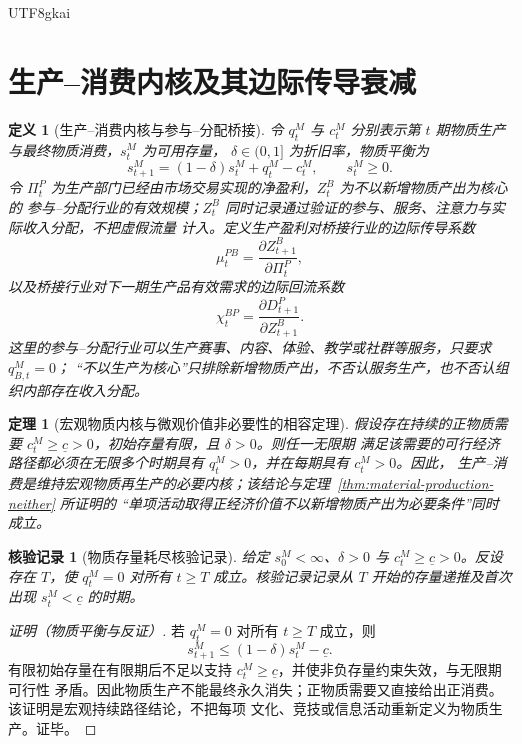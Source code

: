 \documentclass[12pt,a4paper,openany]{report}
\newtheorem{definition}{定义}[chapter]
\newtheorem{theorem}{定理}[chapter]
\newtheorem{Certificate}{核验记录}[chapter]
\begin{document}
\begin{CJK*}{UTF8}{gkai}
\section{生产--消费内核及其边际传导衰减}

\begin{definition}[生产--消费内核与参与--分配桥接]
令 \(q_t^M\) 与 \(c_t^M\) 分别表示第 \(t\) 期物质生产与最终物质消费，\(s_t^M\) 为可用存量，
\(\delta\in(0,1]\) 为折旧率，物质平衡为
\[
  s_{t+1}^M=(1-\delta)s_t^M+q_t^M-c_t^M,
  \qquad s_t^M\ge0.
\]
令 \(\Pi_t^P\) 为生产部门已经由市场交易实现的净盈利，\(Z_t^B\) 为不以新增物质产出为核心的
参与--分配行业的有效规模；\(Z_t^B\) 同时记录通过验证的参与、服务、注意力与实际收入分配，不把虚假流量
计入。定义生产盈利对桥接行业的边际传导系数
\[
  \mu_t^{PB}
  =\frac{\partial Z_{t+1}^B}{\partial\Pi_t^P},
\]
以及桥接行业对下一期生产品有效需求的边际回流系数
\[
  \chi_t^{BP}
  =\frac{\partial D_{t+1}^P}{\partial Z_{t+1}^B}.
\]
这里的参与--分配行业可以生产赛事、内容、体验、教学或社群等服务，只要求 \(q_{B,t}^M=0\)；
“不以生产为核心”只排除新增物质产出，不否认服务生产，也不否认组织内部存在收入分配。
\end{definition}

\begin{theorem}[宏观物质内核与微观价值非必要性的相容定理]
\label{thm:material-core-compatibility}
假设存在持续的正物质需要 \(c_t^M\ge\underline c>0\)，初始存量有限，且 \(\delta>0\)。则任一无限期
满足该需要的可行经济路径都必须在无限多个时期具有 \(q_t^M>0\)，并在每期具有 \(c_t^M>0\)。因此，
生产--消费是维持宏观物质再生产的必要内核；该结论与定理~\ref{thm:material-production-neither} 所证明的
“单项活动取得正经济价值不以新增物质产出为必要条件”同时成立。
\end{theorem}

\begin{Certificate}[物质存量耗尽核验记录]
给定 \(s_0^M<\infty\)、\(\delta>0\) 与 \(c_t^M\ge\underline c>0\)。反设存在 \(T\)，使
\(q_t^M=0\) 对所有 \(t\ge T\) 成立。核验记录记录从 \(T\) 开始的存量递推及首次出现
\(s_t^M<\underline c\) 的时期。
\end{Certificate}

\begin{proof}[证明（物质平衡与反证）]
若 \(q_t^M=0\) 对所有 \(t\ge T\) 成立，则
\[
  s_{t+1}^M\le(1-\delta)s_t^M-\underline c.
\]
有限初始存量在有限期后不足以支持 \(c_t^M\ge\underline c\)，并使非负存量约束失效，与无限期可行性
矛盾。因此物质生产不能最终永久消失；正物质需要又直接给出正消费。该证明是宏观持续路径结论，不把每项
文化、竞技或信息活动重新定义为物质生产。证毕。
\end{proof}


\end{CJK*}
\end{document}
